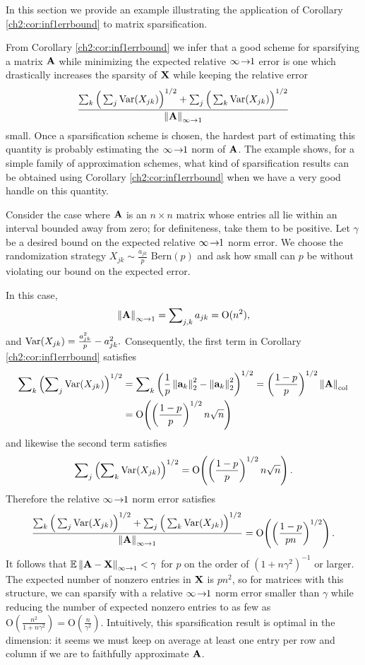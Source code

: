 In this section we provide an example illustrating the application of Corollary
\ref{ch2:cor:inf1errbound} to matrix sparsification.

From Corollary \ref{ch2:cor:inf1errbound} we infer that a good scheme for
sparsifying a matrix $\mathbf{A}$ while minimizing the expected relative $\infty\!\rightarrow\!\!1$
error is one which drastically increases the sparsity of $\mathbf{X}$ while keeping
the relative error 
\[
\frac{\sum\nolimits_{k}\Big(\sum\nolimits_{j}\operatorname{Var}(X_{jk})\Big)^{1/2}
+\sum\nolimits_{j}\Big(\sum\nolimits_{k}\operatorname{Var}(X_{jk})\Big)^{1/2}}{\left\|\mathbf{
A}\right\|_{\infty\rightarrow 1}}
\]
small. Once a sparsification scheme is chosen, the hardest part of estimating
this quantity is probably estimating the $\infty\!\rightarrow\!\!1$ norm of $\mathbf{A}$. The
example shows, for a simple family of approximation schemes, what kind of
sparsification results can be obtained using Corollary \ref{ch2:cor:inf1errbound}
when we have a very good handle on this quantity. 

Consider the case where $\mathbf{A}$ is an $n\times n$ matrix whose entries all lie
within an interval bounded away from zero; for definiteness, take them to be
positive. Let $\gamma$ be a desired bound on the expected relative $\infty\!\rightarrow\!\!1$
norm error. We choose the randomization strategy $X_{jk}\sim
\frac{a_{jk}}{p}\text{ Bern}(p)$ and ask how small can $p$ be without violating
our bound on the expected error.

In this case,
\[
\left\|\mathbf{A}\right\|_{\infty\rightarrow 1}=\sum\nolimits_{j,k}a_{jk} = \mathrm{O}(n^{2}),
\]
and $\operatorname{Var}(X_{jk})=\frac{a_{jk}^{2}}{p}-a_{jk}^{2}.$ Consequently, the first term
in Corollary \ref{ch2:cor:inf1errbound} satisfies
\[
\begin{aligned}
\sum\nolimits_{k}\left(\sum\nolimits_{j}\operatorname{Var}(X_{jk})\right)^{1/2} &
=\sum\nolimits_{k}\left(\frac{1}{p}\left\|\mathbf{a}_{k}\right\|_{2}^{2}-\left\|\mathbf{a}_{k}\right\|
_{2}^{2}\right)^{1/2}=\left(\frac{1-p}{p}\right)^{1/2}\left\|\mathbf{A}\right\|_{\mathrm{col}} \\
 & = \mathop{\text{O}}\!\left(\left(\frac{1-p}{p}\right)^{1/2}n\sqrt{n}\right)
\end{aligned}
\]
and likewise the second term satisfies
\[
\sum\nolimits_{j}\left(\sum\nolimits_{k}\operatorname{Var}(X_{jk})\right)^{1/2} =
\mathop{\text{O}}\!\left(\left(\frac{1-p}{p}\right)^{1/2}n\sqrt{n}\right).
\]
Therefore the relative $\infty\!\rightarrow\!\!1$ norm error satisfies
\[
\frac{\sum\nolimits_{k}\Big(\sum\nolimits_{j}\operatorname{Var}(X_{jk})\Big)^{1/2}
+\sum\nolimits_{j}\Big(\sum\nolimits_{k}\operatorname{Var}(X_{jk})\Big)^{1/2}
}{\left\|\mathbf{A}\right\|_{\infty\rightarrow 1}}= \mathop{\text{O}}\!\left(\left(\frac{1-p}{pn}\right)^{1/2}\right).
\]
It follows that $\mathbb{E}\left\|\mathbf{A}-\mathbf{X}\right\|_{\infty\rightarrow 1}<\gamma$ for $p$ on the order of
$(1+n\gamma^{2})^{-1}$ or larger. The expected number of nonzero entries in
$\mathbf{X}$ is $pn^{2}$, so for matrices with this structure, we can sparsify with
a relative $\infty\!\rightarrow\!\!1$ norm error smaller than $\gamma$ while reducing the number
of expected nonzero entries to as few as
$\mathrm{O}(\frac{n^{2}}{1+n\gamma^{2}})=\mathrm{O}(\frac{n}{\gamma^{2}}).$
Intuitively, this sparsification result is optimal in the dimension: it seems we
must keep on average at least one entry per row and column if we
are to faithfully approximate $\mathbf{A}$.

